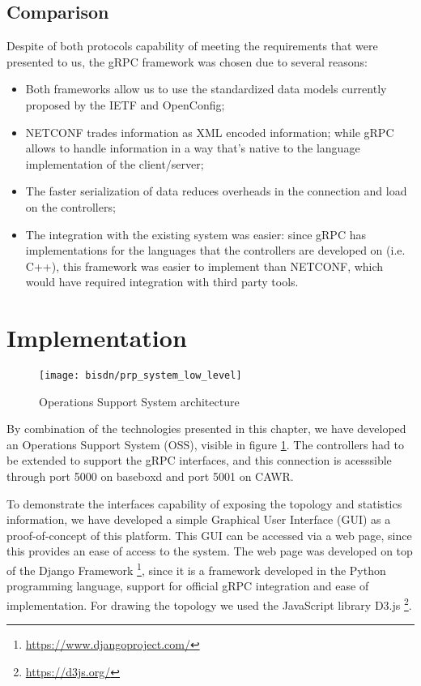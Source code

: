 \subsection{Comparison}

\par Despite of both protocols capability of meeting the requirements that were presented to us, the gRPC framework was chosen due to several reasons:

\begin {itemize}
    \item Both frameworks allow us to use the standardized data models currently proposed by the IETF and OpenConfig;
    \item NETCONF trades information as XML encoded information; while gRPC allows to handle information in a way that’s native to the language implementation 
        of the client/server;
    \item The faster serialization of data reduces overheads in the connection and load on the controllers;
    \item The integration with the existing system was easier: since gRPC has implementations for the languages that the controllers are developed on
        (i.e. C++), this framework was easier to implement than NETCONF, which would have required integration with third party tools.
\end {itemize}

\section {Implementation}

\begin{figure}
    \centering
    \texttt{[image: bisdn/prp\_system\_low\_level]}
    \caption{Operations Support System architecture}
    \label{fig:oss}
\end{figure}

By combination of the technologies presented in this chapter, we have developed an Operations Support System (OSS), visible in figure \ref{fig:oss}. The controllers
had to be extended to support the gRPC interfaces, and this connection is acesssible through port 5000 on baseboxd and port 5001 on CAWR.

\par To demonstrate the interfaces capability of exposing the topology and statistics information, we have developed a simple Graphical User Interface (GUI) as a 
proof-of-concept of this platform. This GUI can be accessed via a web page, since this provides an ease of access to the system.  The web page was developed on top
of the Django Framework \footnote{\url{https://www.djangoproject.com/}}, since it is a framework developed in the Python programming language, support for official 
gRPC integration and ease of implementation. For drawing the topology we used the JavaScript library D3.js \footnote{\url{https://d3js.org/}}.

